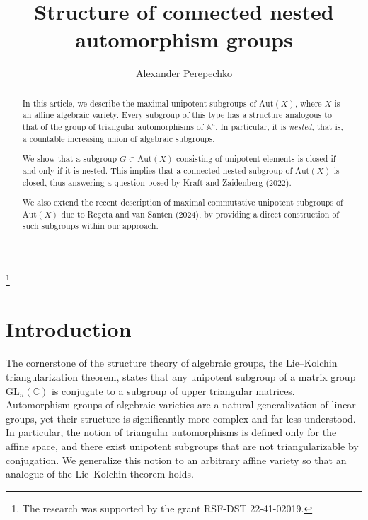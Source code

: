 \documentclass[12pt,a4paper]{amsart}
\theoremstyle{plain}
\theoremstyle{definition}
\theoremstyle{remark}
\def\CC{{\mathbb C}}
\begin{document}
\title[Nested automorphism subgroups]{Structure of connected nested automorphism groups}

\author{Alexander Perepechko}
\thanks{
   The research was supported by the grant RSF-DST 22-41-02019.}



\begin{abstract} 
   In this article, we describe the maximal unipotent subgroups of $\mathrm{Aut}(X)$, where $X$ is an affine algebraic variety. Every subgroup of this type has a structure analogous to that of the group of triangular automorphisms of $\mathbb{A}^n$. In particular, it is \emph{nested}, that is, a countable increasing union of algebraic subgroups.

We show that a subgroup $G\subset\mathrm{Aut}(X)$ consisting of unipotent elements is closed if and only if it is nested. This implies that a connected nested subgroup of $\mathrm{Aut}(X)$ is closed, thus answering a question posed by Kraft and Zaidenberg (2022).

We also extend the recent description of maximal commutative unipotent subgroups of $\mathrm{Aut}(X)$ due to Regeta and van Santen (2024), by providing a direct construction of such subgroups within our approach.
\end{abstract}

\maketitle


\section{Introduction}

The cornerstone of the structure theory of algebraic groups, the Lie--Kolchin triangularization theorem, states that any unipotent subgroup of a matrix group $\mathrm{GL}_n(\CC)$ is conjugate to a subgroup of upper triangular matrices. 
Automorphism groups of algebraic varieties are a natural generalization of linear groups, yet their structure is significantly more complex and far less understood. 
In particular, the notion of triangular automorphisms is defined only for the affine space, and there exist unipotent subgroups that are not triangularizable by conjugation.
We generalize this notion to an arbitrary affine variety so that an analogue of the Lie--Kolchin theorem holds.
\end{document}
